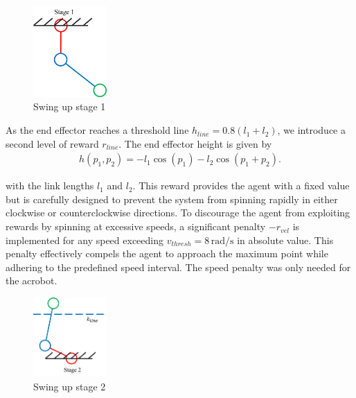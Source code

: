 \begin{figure}[H]
    \centering
    \includegraphics[width=0.25\textwidth]{figures/methodology/stage1.png} %
    \caption{Swing up stage 1}
    \label{fig:my_image_label} %
\end{figure}

As the end effector reaches a threshold line \(h_{line} = 0.8(l_1+l_2)\), we
introduce a second level of reward \(r_{line}\). The end effector height is
given by
\begin{align}
    h(p_1, p_2) = -l_1\cos(p_1) - l_2 \cos(p_1 + p_2).
\end{align}

with the link lengths $l_1$ and $l_2$.
This reward provides the agent with a fixed value
but is carefully designed to prevent the system from spinning rapidly in either
clockwise or counterclockwise directions. To discourage the agent from
exploiting rewards by spinning at excessive speeds, a significant penalty
\(-r_{vel}\) is implemented for any speed exceeding $v_{thresh}=8\,
\text{rad}/\text{s}$ in absolute value.
This penalty effectively compels the agent to approach the maximum point while
adhering to the predefined speed interval. The speed penalty was only needed for
the acrobot.

\begin{figure}[H]
    \centering
    \includegraphics[width=0.25\textwidth]{figures/methodology/stage2.png} %
    \caption{Swing up stage 2}
    \label{fig:my_image_label} %
\end{figure}

